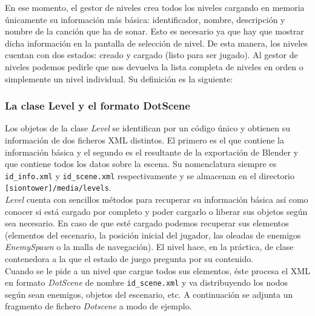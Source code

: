 

En ese momento, el gestor de niveles crea todos los niveles cargando en memoria
únicamente su información más básica: identificador, nombre, descripción
y nombre de la canción que ha de sonar. Esto es necesario ya que hay que mostrar
dicha información en la pantalla de selección de nivel. De esta manera, los
niveles cuentan con dos estados: creado y cargado (listo para ser jugado).
Al gestor de niveles podemos pedirle que nos devuelva la lista completa
de niveles en orden o simplemente un nivel individual. Su definición es la
siguiente:\\



\subsubsection{La clase Level y el formato DotScene}

Los objetos de la clase \textit{Level} se identifican por un código único
y obtienen su información de dos ficheros XML distintos. El primero es el
que contiene la información básica y el segundo es el resultante de la exportación
de Blender y que contiene todos los datos sobre la escena. Su nomenclatura
siempre es \texttt{id\_info.xml} y \texttt{id\_scene.xml} respectivamente
y se almacenan en el directorio \texttt{[siontower]/media/levels}.\\

\textit{Level} cuenta con sencillos métodos para recuperar su información
básica así como conocer si está cargado por completo y poder cargarlo
o liberar sus objetos según sea necesario. En caso de que esté cargado
podemos recuperar sus elementos (elementos del escenario, la posición
inicial del jugador, las oleadas de enemigos \textit{EnemySpawn} o la malla
de navegación). El nivel hace, en la práctica, de clase contenedora a la
que el estado de juego pregunta por su contenido.\\

Cuando se le pide a un nivel que cargue todos sus elementos, éste procesa
el XML en formato \textit{DotScene} de nombre \texttt{id\_scene.xml} y va
distribuyendo los nodos según sean enemigos, objetos del escenario, etc.
A continuación se adjunta un fragmento de fichero \textit{Dotscene} a modo
de ejemplo.\\



